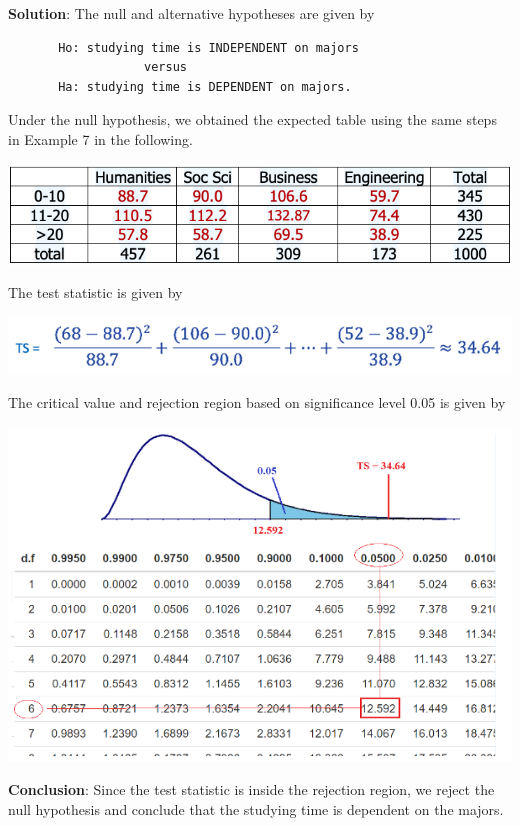 \documentclass[
]{article}
\begin{document}
\textbf{Solution}: The null and alternative hypotheses are given by

\begin{verbatim}
       Ho: studying time is INDEPENDENT on majors
                   versus
       Ha: studying time is DEPENDENT on majors.
\end{verbatim}

Under the null hypothesis, we obtained the expected table using the same
steps in Example 7 in the following.

\begin{center}\includegraphics[width=0.55\linewidth]{week13/example09ExpTable} \end{center}

The test statistic is given by

\begin{center}\includegraphics[width=0.6\linewidth]{week13/example09TS} \end{center}

The critical value and rejection region based on significance level 0.05
is given by

\begin{center}\includegraphics[width=0.8\linewidth]{week13/example09CV} \end{center}

\textbf{Conclusion}: Since the test statistic is inside the rejection
region, we reject the null hypothesis and conclude that the studying
time is dependent on the majors.
\end{document}
